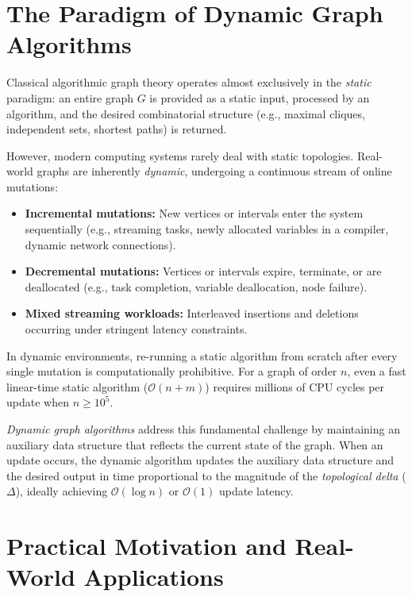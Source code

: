 \section{The Paradigm of Dynamic Graph Algorithms}
\label{sec:intro_dynamic_paradigm}

Classical algorithmic graph theory operates almost exclusively in the \emph{static} paradigm: an entire graph $G$ is provided as a static input, processed by an algorithm, and the desired combinatorial structure (e.g., maximal cliques, independent sets, shortest paths) is returned. 

However, modern computing systems rarely deal with static topologies. Real-world graphs are inherently \emph{dynamic}, undergoing a continuous stream of online mutations:
\begin{itemize}
    \item \textbf{Incremental mutations:} New vertices or intervals enter the system sequentially (e.g., streaming tasks, newly allocated variables in a compiler, dynamic network connections).
    \item \textbf{Decremental mutations:} Vertices or intervals expire, terminate, or are deallocated (e.g., task completion, variable deallocation, node failure).
    \item \textbf{Mixed streaming workloads:} Interleaved insertions and deletions occurring under stringent latency constraints.
\end{itemize}

In dynamic environments, re-running a static algorithm from scratch after every single mutation is computationally prohibitive. For a graph of order $n$, even a fast linear-time static algorithm ($\mathcal{O}(n + m)$) requires millions of CPU cycles per update when $n \ge 10^5$. 

\emph{Dynamic graph algorithms} address this fundamental challenge by maintaining an auxiliary data structure that reflects the current state of the graph. When an update occurs, the dynamic algorithm updates the auxiliary data structure and the desired output in time proportional to the magnitude of the \emph{topological delta} ($\Delta$), ideally achieving $\mathcal{O}(\log n)$ or $\mathcal{O}(1)$ update latency.

\section{Practical Motivation and Real-World Applications}
\label{sec:intro_applications}

